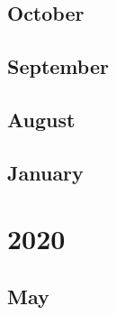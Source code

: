 \documentclass[12pt]{article}
\begin{document}
\subsection{October}
\begin{refsection}
    \nocite{sanh_multitask_2022}
    \printbibliography[heading=none]
\end{refsection}

\subsection{September}
\begin{refsection}
    \nocite{wei_finetuned_2021}
    \printbibliography[heading=none]
\end{refsection}


\subsection{August}
\begin{refsection}
    \nocite{chen_evaluating_2021}
    \nocite{bommasani_opportunities_2022}
    \printbibliography[heading=none]
\end{refsection}


\subsection{January}
\begin{refsection}
    \nocite{fedus_switch_2022}
    \printbibliography[heading=none]
\end{refsection}

\newpage
\section{2020}
\subsection{May}
\begin{refsection}
    \nocite{brown_language_2020}
    \printbibliography[heading=none]
\end{refsection}
\end{document}
